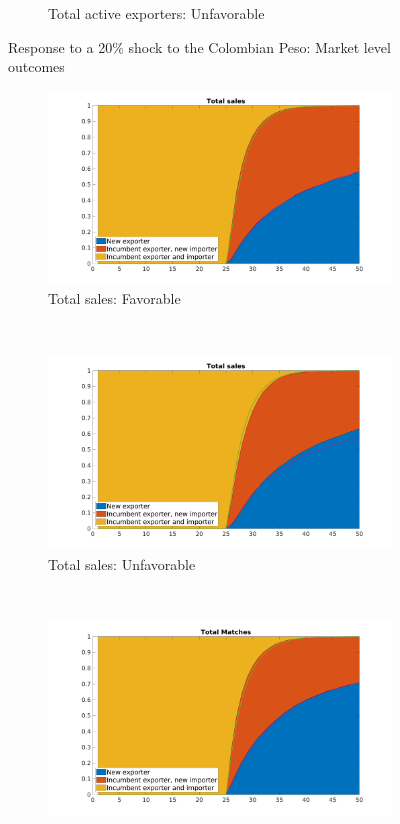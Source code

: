 \documentclass[12pt]{article}
\begin{document}
\begin{figure}[tbp]
\begin{subfigure}[b]{0.45\textwidth}
        \caption{Total active exporters: Unfavorable}
    \end{subfigure}
\caption{Response to a 20\% shock to the Colombian Peso: Market level
outcomes}
\label{fig:export_dynamics_macro}
\end{figure}

\begin{figure}[tbp]
\centering
\begin{subfigure}[b]{0.45\textwidth}
        \centering
        \includegraphics[width=\textwidth]{figures/total_sales_pct}
        \caption{Total sales: Favorable}
    \end{subfigure} ~ 
\begin{subfigure}[b]{0.45\textwidth}
        \centering
        \includegraphics[width=\textwidth]{figures/total_sales_pct_unf}
        \caption{Total sales: Unfavorable}
    \end{subfigure} \newline
~ 
\begin{subfigure}[b]{0.45\textwidth}
        \centering
        \includegraphics[width=\textwidth]{figures/total_matches_pct}

\end{subfigure}
\end{figure}
\end{document}
